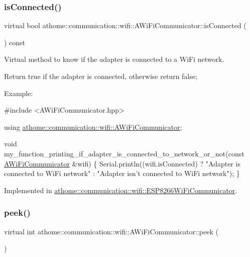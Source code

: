 \subsubsection{\texorpdfstring{is\+Connected()}{isConnected()}}
{\footnotesize\ttfamily virtual bool athome\+::communication\+::wifi\+::\+A\+Wi\+Fi\+Communicator\+::is\+Connected (\begin{DoxyParamCaption}{ }\end{DoxyParamCaption}) const\hspace{0.3cm}{\ttfamily [pure virtual]}}

Virtual method to know if the adapter is connected to a Wi\+Fi network.

Return true if the adapter is connected, otherwise return false;

Example\+:


\begin{DoxyCode}
\textcolor{preprocessor}{#include <AWiFiCommunicator.hpp>}

\textcolor{keyword}{using} \mbox{\hyperlink{classathome_1_1communication_1_1wifi_1_1_a_wi_fi_communicator}{athome::communication::wifi::AWiFiCommunicator}};

\textcolor{keywordtype}{void} my\_function\_printing\_if\_adapter\_is\_connected\_to\_network\_or\_not(\textcolor{keyword}{const} 
      \mbox{\hyperlink{classathome_1_1communication_1_1wifi_1_1_a_wi_fi_communicator_a0098148fe8d0eeee99b7f8f72a72a900}{AWiFiCommunicator}} &wifi) \{
  Serial.println((wifi.isConnected) ? \textcolor{stringliteral}{"Adapter is connected to WiFi network"} : \textcolor{stringliteral}{"Adapter isn't connected to
       WiFi network"});
\}
\end{DoxyCode}
 

Implemented in \mbox{\hyperlink{classathome_1_1communication_1_1wifi_1_1_e_s_p8266_wi_fi_communicator_aefadac9b1a67d52853495dfabecad5fd}{athome\+::communication\+::wifi\+::\+E\+S\+P8266\+Wi\+Fi\+Communicator}}.

\mbox{\label{classathome_1_1communication_1_1wifi_1_1_a_wi_fi_communicator_ad5c39b1ea49f77026371c8e8ff2dba63}} 
\subsubsection{\texorpdfstring{peek()}{peek()}}
{\footnotesize\ttfamily virtual int athome\+::communication\+::wifi\+::\+A\+Wi\+Fi\+Communicator\+::peek (\begin{DoxyParamCaption}{ }\end{DoxyParamCaption})\hspace{0.3cm}{\ttfamily [pure virtual]}}

